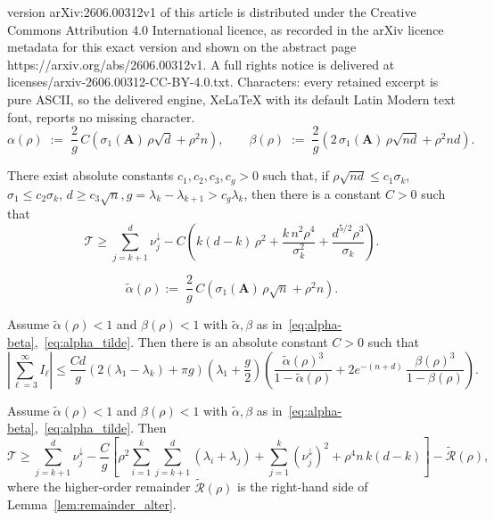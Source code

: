 \documentclass[10pt,a4paper]{amsart}
\newcommand{\Ab}{\mathbf{A}}
\newcommand{\Rcal}{\mathcal{R}}
\newcommand{\Tcal}{\mathcal{T}}
\newcommand{\abr}[1]{\left|#1\right|}
\newcommand{\rbr}[1]{\left(#1\right)}
\newcommand{\sbr}[1]{\left[#1\right]}
\begin{document}
version arXiv:2606.00312v1 of this article is distributed under the Creative Commons Attribution 4.0 International licence, as recorded in the arXiv licence metadata for this exact version and shown on the abstract page https://arxiv.org/abs/2606.00312v1. A full rights notice is delivered at licenses/arxiv-2606.00312-CC-BY-4.0.txt. Characters: every retained excerpt is pure ASCII, so the delivered engine, XeLaTeX with its default Latin Modern text font, reports no missing character.
\begin{equation}\label{eq:alpha-beta}
    \alpha(\rho) \;:=\; \frac{2}{g}\,C\rbr{\sigma_1(\Ab)\,\rho\sqrt{d} + \rho^2 n},
    \qquad
    \beta(\rho) \;:=\; \frac{2}{g}\rbr{2\,\sigma_1(\Ab)\,\rho\sqrt{nd} + \rho^2 nd}.
\end{equation}

\begin{corollary}\label{cor:smallcluster}
There exist absolute constants $c_1, c_2, c_3, c_g > 0$ such that, if $\rho\sqrt{nd} \le c_1\sigma_k$, $\sigma_1 \le c_2\sigma_k$, $d \ge c_3\sqrt n, g= \lambda_k - \lambda_{k+1} > c_g \lambda_k$, then there is a constant $C > 0$ such that
\begin{equation*}
    \Tcal \ge \sum_{j=k+1}^{d}\nu_j^\downarrow - C\rbr{k(d-k)\,\rho^2 + \frac{k\,n^2 \rho^4}{\sigma_k^2} + \frac{d^{5/2}\rho^3}{\sigma_k}}.
\end{equation*}
\end{corollary}

\begin{equation}\label{eq:alpha_tilde}
    \tilde{\alpha}(\rho):= \; \frac{2}{g}\,C\rbr{\sigma_1(\Ab)\,\rho\sqrt{n} + \rho^2 n}.
\end{equation}

\begin{lemma}\label{lem:remainder_alter}
Assume $\tilde{\alpha}(\rho) < 1$ and $\beta(\rho) < 1$ with $\tilde{\alpha},\beta$ as in~\eqref{eq:alpha-beta},~\eqref{eq:alpha_tilde}. Then there is an absolute constant $C > 0$ such that
\begin{equation*}
    \abr{\sum_{\ell=3}^{\infty} I_\ell} \le \frac{Cd}{g}\rbr{2(\lambda_1 - \lambda_k) + \pi g}\rbr{\lambda_1 + \frac{g}{2}}\rbr{\frac{\tilde{\alpha}(\rho)^3}{1 - \tilde{\alpha}(\rho)} + 2 e^{-(n+d)}\,\frac{\beta(\rho)^3}{1 - \beta(\rho)}}.
\end{equation*}
\end{lemma}

\begin{theorem}\label{thm:smallcluster-main_alter}
Assume $\tilde{\alpha}(\rho) < 1$ and $\beta(\rho) < 1$ with $\tilde{\alpha}, \beta$ as in~\eqref{eq:alpha-beta},~\eqref{eq:alpha_tilde}. Then
\begin{equation*}
    \Tcal \ge \sum_{j=k+1}^{d}\nu_j^\downarrow - \frac{C}{g}\sbr{\rho^2 \sum_{i=1}^{k}\sum_{j=k+1}^{d}(\lambda_i + \lambda_j) + \sum_{j=1}^{k}\rbr{\nu_j^\downarrow}^2 + \rho^4 n\, k(d-k)} - \tilde{\Rcal}(\rho),
\end{equation*}
where the higher-order remainder $\tilde{\Rcal}(\rho)$ is the right-hand side of Lemma~\ref{lem:remainder_alter}.
\end{theorem}
\end{document}
